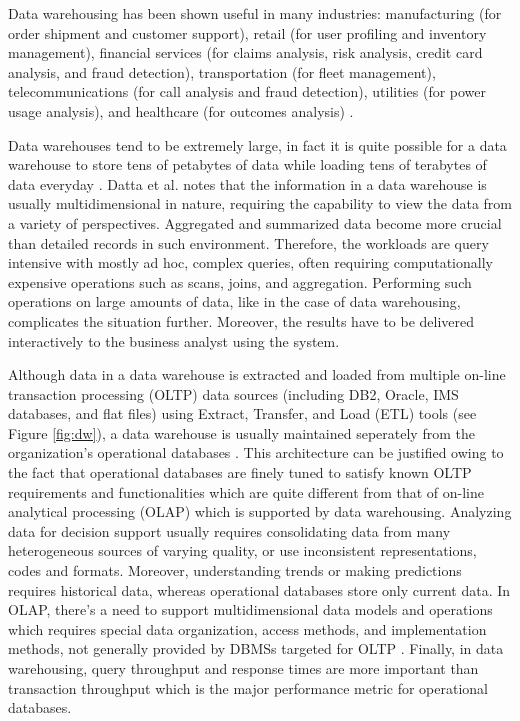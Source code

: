 \documentclass[12pt,a4paper]{article}
\begin{document}
Data warehousing has been shown useful in many industries: manufacturing (for order shipment and customer support), retail (for user profiling and inventory
management), financial services (for claims analysis, risk analysis, credit card analysis, and fraud detection), transportation (for fleet management),
telecommunications (for call analysis and fraud detection), utilities (for power usage analysis), and healthcare (for outcomes analysis) \cite{248616}.

Data warehouses tend to be extremely large, in fact it is quite possible for a data warehouse to store tens of petabytes of data while loading tens of terabytes of data everyday \cite{thusoo2010data}. Datta et al. \cite {628286} notes that the information in a data warehouse is usually multidimensional in nature, requiring the capability to view the data from a variety of perspectives. Aggregated and summarized data become more crucial than detailed records in such environment. Therefore, the workloads are query intensive with mostly ad hoc, complex queries, often requiring computationally expensive operations such as scans, joins, and aggregation. Performing such operations on large amounts of data, like in the case of data warehousing, complicates the situation further. Moreover, the results have to be delivered interactively to the business analyst using the system.

Although data in a data warehouse is extracted and loaded from multiple on-line transaction processing (OLTP) data sources (including DB2, Oracle, IMS databases, and flat files) using Extract, Transfer, and Load (ETL) tools (see Figure \ref{fig:dw}), a data warehouse is usually maintained seperately from the organization's operational databases \cite{sen2005comparison, 248616}. This architecture can be justified owing to the fact that operational databases are finely tuned to satisfy known OLTP requirements and functionalities which are quite different from that of on-line analytical processing (OLAP) which is supported by data warehousing. Analyzing data for decision support usually requires consolidating data from many heterogeneous sources of varying quality, or use inconsistent representations, codes and formats. Moreover, understanding trends or making predictions requires historical data, whereas operational databases store only current data. In OLAP, there's a need to support multidimensional data models and operations which requires special data organization, access methods, and implementation methods, not generally provided by DBMSs targeted for OLTP \cite{248616}. Finally, in data warehousing, query throughput and response times are more important than transaction throughput which is the major performance metric for operational databases.
\end{document}
